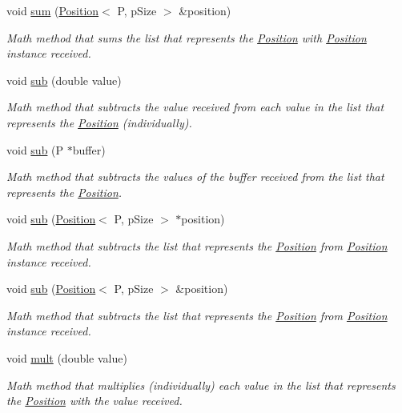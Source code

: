 \begin{DoxyCompactItemize}
void \hyperlink{structPosition_a2aeaf823d70f300b847ce8cb616f192a}{sum} (\hyperlink{structPosition}{Position}$<$ P, p\+Size $>$ \&position)
\begin{DoxyCompactList}\small\item\em Math method that sums the list that represents the \hyperlink{structPosition}{Position} with \hyperlink{structPosition}{Position} instance received. \end{DoxyCompactList}\item 
void \hyperlink{structPosition_a4099812c9395b6dbe03ca8d25f7ae7fc}{sub} (double value)
\begin{DoxyCompactList}\small\item\em Math method that subtracts the value received from each value in the list that represents the \hyperlink{structPosition}{Position} (individually). \end{DoxyCompactList}\item 
void \hyperlink{structPosition_a814f63f8a5d25a5b20675928e169f318}{sub} (P $\ast$buffer)
\begin{DoxyCompactList}\small\item\em Math method that subtracts the values of the buffer received from the list that represents the \hyperlink{structPosition}{Position}. \end{DoxyCompactList}\item 
void \hyperlink{structPosition_a09bbd5c9bbd247ccd0307a5968a40564}{sub} (\hyperlink{structPosition}{Position}$<$ P, p\+Size $>$ $\ast$position)
\begin{DoxyCompactList}\small\item\em Math method that subtracts the list that represents the \hyperlink{structPosition}{Position} from \hyperlink{structPosition}{Position} instance received. \end{DoxyCompactList}\item 
void \hyperlink{structPosition_a3c83b8c1230dbde60c84301283cf7fdc}{sub} (\hyperlink{structPosition}{Position}$<$ P, p\+Size $>$ \&position)
\begin{DoxyCompactList}\small\item\em Math method that subtracts the list that represents the \hyperlink{structPosition}{Position} from \hyperlink{structPosition}{Position} instance received. \end{DoxyCompactList}\item 
void \hyperlink{structPosition_a161444b6ea70afe4cfc7bdd81678105c}{mult} (double value)
\begin{DoxyCompactList}\small\item\em Math method that multiplies (individually) each value in the list that represents the \hyperlink{structPosition}{Position} with the value received. \end{DoxyCompactList}\item 

\end{DoxyCompactItemize}
